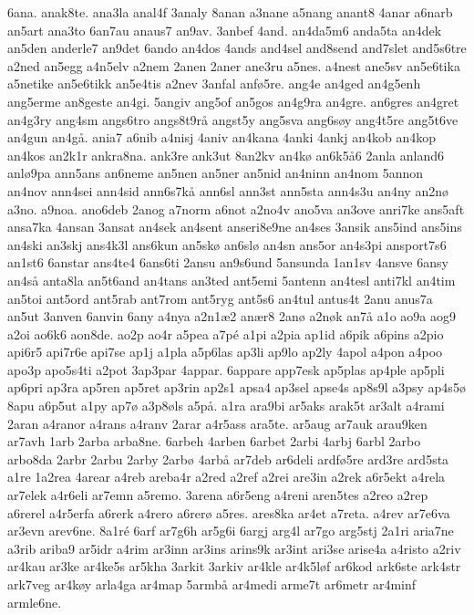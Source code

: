 6ana.
anak8te.
ana3la
anal4f
3analy
8anan
a3nane
a5nang
anant8
4anar
a6narb
an5art
ana3to
6an7au
anaus7
an9av.
3anbef
4and.
an4da5m6
anda5ta
an4dek
an5den
anderle7
an9det
6ando
an4dos
4ands
and4sel
and8send
and7slet
and5s6tre
a2ned
an5egg
a4n5elv
a2nem
2anen
2aner
ane3ru
a5nes.
a4nest
ane5sv
an5e6tika
a5netike
an5e6tikk
an5e4tis
a2nev
3anfal
anf^^f85re.
ang4e
an4ged
an4g5enh
ang5erme
an8geste
an4gi.
5angiv
ang5of
an5gos
an4g9ra
an4gre.
an6gres
an4gret
an4g3ry
ang4sm
angs6tro
angs8t9r^^e5
angst5y
ang5sva
ang6s^^f8y
ang4t5re
ang5t6ve
an4gun
an4g^^e5.
ania7
a6nib
a4nisj
4aniv
an4kana
4anki
4ankj
an4kob
an4kop
an4kos
an2k1r
ankra8na.
ank3re
ank3ut
8an2kv
an4k^^f8
an6k5^^e56
2anla
anland6
anl^^f89pa
ann5ans
an6neme
an5nen
an5ner
an5nid
an4ninn
an4nom
5annon
an4nov
ann4sei
ann4sid
ann6s7k^^e5
ann6sl
ann3st
ann5sta
ann4s3u
an4ny
an2n^^f8
a3no.
a9noa.
ano6deb
2anog
a7norm
a6not
a2no4v
ano5va
an3ove
anri7ke
ans5aft
ansa7ka
4ansan
3ansat
an4sek
an4sent
anseri8e9ne
an4ses
3ansik
ans5ind
ans5ins
an4ski
an3skj
ans4k3l
ans6kun
an5sk^^f8
an6sl^^f8
an4sn
ans5or
an4s3pi
ansport7s6
an1st6
6anstar
ans4te4
6ans6ti	
2ansu
an9s6und
5ansunda
1an1sv
4ansve
6ansy
an4s^^e5
anta8la
an5t6and
an4tans
an3ted
ant5emi
5antenn
an4tesl
anti7kl
an4tim
an5toi
ant5ord
ant5rab
ant7rom
ant5ryg
ant5s6
an4tul
antus4t
2anu
anus7a
an5ut
3anven
6anvin
6any
a4nya
a2n1^^e62
an^^e6r8
2an^^f8
a2n^^f8k
an7^^e5
a1o
ao9a
aog9
a2oi
ao6k6
aon8de.
ao2p
ao4r
a5pea
a7p^^e9
a1pi
a2pia
ap1id
a6pik
a6pins
a2pio
api6r5
api7r6e
api7se
ap1j
a1pla
a5p6las
ap3li
ap9lo
ap2ly
4apol
a4pon
a4poo
apo3p
apo5s4ti
a2pot
3ap3par
4appar.
6appare
app7esk
ap5plas
ap4ple
ap5pli
ap6pri
ap3ra
ap5ren
ap5ret
ap3rin
ap2s1
apsa4
ap3sel
apse4s
ap8s9l
a3psy
ap4s5^^f8
8apu
a6p5ut
a1py
ap7^^f8
a3p8^^f8ls
a5p^^e5.
a1ra
ara9bi
ar5aks
arak5t
ar3alt
a4rami
2aran
a4ranor
a4rans
a4ranv
2arar
a4r5ass
ara5te.
ar5aug
ar7auk
arau9ken
ar7avh
1arb
2arba
arba8ne.
6arbeh
4arben
6arbet
2arbi
4arbj
6arbl
2arbo
arbo8da
2arbr
2arbu
2arby
2arb^^f8
4arb^^e5
ar7deb
ar6deli
ardf^^f85re
ard3re
ard5sta
a1re
1a2rea
4arear
a4reb
areba4r
a2red
a2ref
a2rei
are3in
a2rek
a6r5ekt
a4rela
ar7elek
a4r6eli
ar7emn
a5remo.
3arena
a6r5eng
a4reni
aren5tes
a2reo
a2rep
a6rerel
a4r5erfa
a6rerk
a4rero
a6rer^^f8
a5res.
ares8ka
ar4et
a7reta.
a4rev
ar7e6va
ar3evn
arev6ne.
8a1r^^e9
6arf
ar7g6h
ar5g6i
6argj
arg4l
ar7go
arg5stj
2a1ri
aria7ne
a3rib
ariba9
ar5idr
a4rim
ar3inn
ar3ins
arins9k
ar3int
ari3se
arise4a
a4risto
a2riv
ar4kau
ar3ke
ar4ke5s
ar5kha
3arkit
3arkiv
ar4kle
ar4k5l^^f8f
ar6kod
ark6ste
ark4str
ark7veg
ar4k^^f8y
arla4ga
ar4map
5armb^^e5
ar4medi
arme7t
ar6metr
ar4minf
armle6ne.
